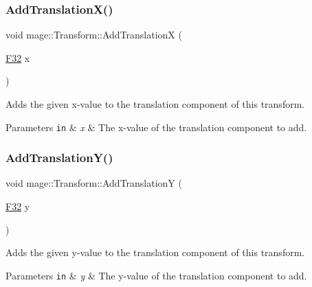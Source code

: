 \subsubsection{\texorpdfstring{Add\+Translation\+X()}{AddTranslationX()}}
{\footnotesize\ttfamily void mage\+::\+Transform\+::\+Add\+TranslationX (\begin{DoxyParamCaption}\item[{\hyperlink{namespacemage_aa97e833b45f06d60a0a9c4fc22ae02c0}{F32}}]{x }\end{DoxyParamCaption})\hspace{0.3cm}{\ttfamily [noexcept]}}

Adds the given x-\/value to the translation component of this transform.


\begin{DoxyParams}[1]{Parameters}
\mbox{\tt in}  & {\em x} & The x-\/value of the translation component to add. \\
\hline
\end{DoxyParams}
\hypertarget{classmage_1_1_transform_abf9253ddafad2725ef6c6e2b4bd44b35}{}\label{classmage_1_1_transform_abf9253ddafad2725ef6c6e2b4bd44b35} 
\subsubsection{\texorpdfstring{Add\+Translation\+Y()}{AddTranslationY()}}
{\footnotesize\ttfamily void mage\+::\+Transform\+::\+Add\+TranslationY (\begin{DoxyParamCaption}\item[{\hyperlink{namespacemage_aa97e833b45f06d60a0a9c4fc22ae02c0}{F32}}]{y }\end{DoxyParamCaption})\hspace{0.3cm}{\ttfamily [noexcept]}}

Adds the given y-\/value to the translation component of this transform.


\begin{DoxyParams}[1]{Parameters}
\mbox{\tt in}  & {\em y} & The y-\/value of the translation component to add. \\
\hline
\end{DoxyParams}
\hypertarget{classmage_1_1_transform_a2554a3af167bb8ae9f4724921e6a3596}{}\label{classmage_1_1_transform_a2554a3af167bb8ae9f4724921e6a3596} 
